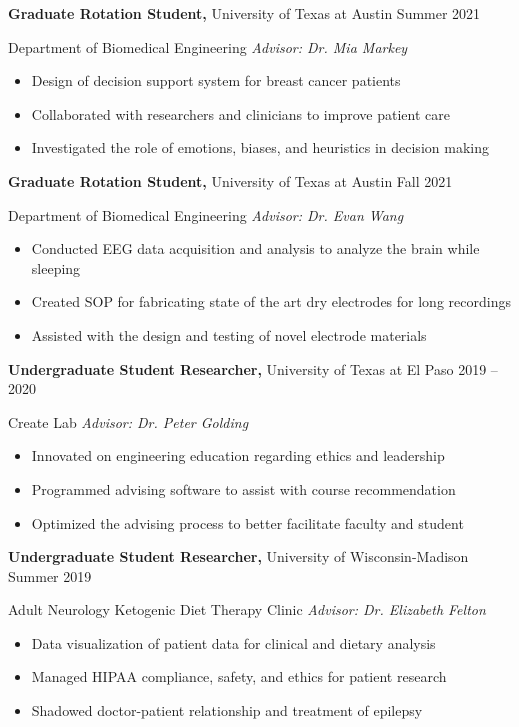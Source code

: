 \documentclass[
]{article}
\begin{document}
\textbf{Graduate Rotation Student,} University of Texas at Austin Summer 2021

Department of Biomedical Engineering \textbar{} \emph{Advisor: Dr. Mia Markey}

\begin{itemize}
\item
  Design of decision support system for breast cancer patients
\item
  Collaborated with researchers and clinicians to improve patient care
\item
  Investigated the role of emotions, biases, and heuristics in decision making
\end{itemize}

\textbf{Graduate Rotation Student,} University of Texas at Austin Fall 2021

Department of Biomedical Engineering \textbar{} \emph{Advisor: Dr. Evan Wang}

\begin{itemize}
\item
  Conducted EEG data acquisition and analysis to analyze the brain while sleeping
\item
  Created SOP for fabricating state of the art dry electrodes for long recordings
\item
  Assisted with the design and testing of novel electrode materials
\end{itemize}

\textbf{\hfill\break
}

\textbf{Undergraduate Student Researcher,} University of Texas at El Paso 2019 -- 2020

Create Lab \textbar{} \emph{Advisor: Dr. Peter Golding}

\begin{itemize}
\item
  Innovated on engineering education regarding ethics and leadership
\item
  Programmed advising software to assist with course recommendation
\item
  Optimized the advising process to better facilitate faculty and student
\end{itemize}

\textbf{Undergraduate Student Researcher,} University of Wisconsin-Madison Summer 2019

Adult Neurology Ketogenic Diet Therapy Clinic \textbar{} \emph{Advisor: Dr. Elizabeth Felton}

\begin{itemize}
\item
  Data visualization of patient data for clinical and dietary analysis
\item
  Managed HIPAA compliance, safety, and ethics for patient research
\item
  Shadowed doctor-patient relationship and treatment of epilepsy
\end{itemize}
\end{document}
